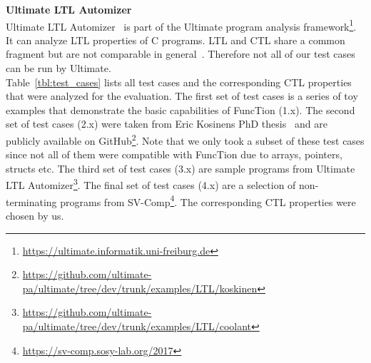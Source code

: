 \documentclass[11pt,a4paper,titlepage]{article}
\theoremstyle{definition}
\begin{document}
\textbf{Ultimate LTL Automizer}\\
Ultimate LTL Automizer~\cite{DBLP:conf/cav/DietschHLP15} 
is part of the Ultimate program analysis framework\footnote{\url{https://ultimate.informatik.uni-freiburg.de}}. 
It can analyze LTL properties of C programs. LTL and CTL share a common fragment but are not comparable in general~\cite{Baier:2008:PMC}.
Therefore not all of our test cases can be run by Ultimate.\\

Table~\ref{tbl:test_cases} lists all test cases and the corresponding CTL properties that were analyzed for the
evaluation. The first set of test cases is a series of toy examples that demonstrate the basic capabilities of FuncTion (1.x). 
The second set of test cases (2.x) were taken from Eric Kosinens PhD thesis~\cite{KoskinenPhd} and are publicly available on 
GitHub\footnote{\url{https://github.com/ultimate-pa/ultimate/tree/dev/trunk/examples/LTL/koskinen}}. 
Note that we only took a subset of these test cases since not all of them were 
compatible with FuncTion due to arrays, pointers, structs etc. 
The third set of test cases (3.x) are sample programs from 
Ultimate LTL Automizer\footnote{\url{https://github.com/ultimate-pa/ultimate/tree/dev/trunk/examples/LTL/coolant}}. 
The final set of test cases (4.x) are a selection of non-terminating programs from SV-Comp\footnote{\url{https://sv-comp.sosy-lab.org/2017}}. 
The corresponding CTL properties were chosen by us.\\
\end{document}
